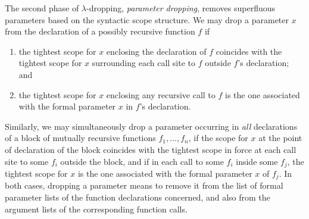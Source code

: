 The second phase of $\lambda$-dropping, \emph{parameter dropping},
removes superfluous parameters based on the syntactic scope structure.
We may drop a parameter $x$ from the declaration of a possibly
recursive function $f$ if
\begin{enumerate}
\item\label{ParameterDroppingConditionOne} the tightest scope for $x$
  enclosing the declaration of $f$ coincides with the tightest scope
  for $x$ surrounding each call site to $f$ outside $f$'s declaration;
  and
\item\label{ParameterDroppingConditionTwo} the tightest scope for $x$
  enclosing any recursive call to $f$ is the one associated with the formal
  parameter $x$ in $f$'s declaration.
\end{enumerate}
Similarly, we may simultaneously drop a parameter occurring in
\emph{all} declarations of a block of mutually recursive functions
$f_1,\ldots,f_n$, if the scope for $x$ at the point of declaration of
the block coincides with the tightest scope in force at each call site
to some $f_i$ outside the block, and if in each call to some $f_i$
inside some $f_j$, the tightest scope for $x$ is the one associated
with the formal parameter $x$ of $f_j$. In both cases, dropping a
parameter means to remove it from the list of formal parameter lists
of the function declarations concerned, and also from the argument
lists of the corresponding function calls.


